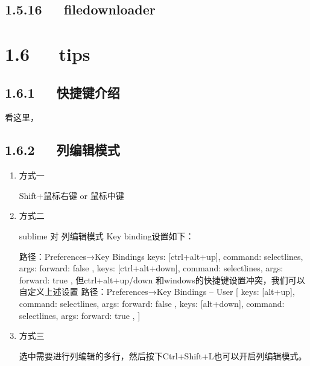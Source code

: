 \documentclass[letterpaper,12pt,english]{sphinxmanual}
\begin{document}
\subsection{1.5.16   file\sphinxhyphen{}downloader}
\label{\detokenize{001software/001install/sublime:file-downloader}}

\section{1.6   tips}
\label{\detokenize{001software/001install/sublime:tips}}

\subsection{1.6.1   快捷键介绍}
\label{\detokenize{001software/001install/sublime:id4}}
看这里，


\subsection{1.6.2   列编辑模式}
\label{\detokenize{001software/001install/sublime:id5}}\begin{enumerate}
%
\item {} 
方式一

Shift+鼠标右键 or 鼠标中键

\item {} 
方式二

sublime 对 列编辑模式 Key binding设置如下：

\begin{sphinxVerbatim}[commandchars=\\\{\}]
路径：Preferences→Key Bindings
   \PYGZob{} \PYGZdq{}keys\PYGZdq{}: [\PYGZdq{}ctrl+alt+up\PYGZdq{}], \PYGZdq{}command\PYGZdq{}: \PYGZdq{}select\PYGZus{}lines\PYGZdq{}, \PYGZdq{}args\PYGZdq{}: \PYGZob{}\PYGZdq{}forward\PYGZdq{}: false\PYGZcb{} \PYGZcb{},
   \PYGZob{} \PYGZdq{}keys\PYGZdq{}: [\PYGZdq{}ctrl+alt+down\PYGZdq{}], \PYGZdq{}command\PYGZdq{}: \PYGZdq{}select\PYGZus{}lines\PYGZdq{}, \PYGZdq{}args\PYGZdq{}: \PYGZob{}\PYGZdq{}forward\PYGZdq{}: true\PYGZcb{} \PYGZcb{},
但ctrl+alt+up/down 和windows的快捷键设置冲突，我们可以自定义上述设置
路径：Preferences→Key Bindings – User
[\PYGZob{} \PYGZdq{}keys\PYGZdq{}: [\PYGZdq{}alt+up\PYGZdq{}], \PYGZdq{}command\PYGZdq{}: \PYGZdq{}select\PYGZus{}lines\PYGZdq{}, \PYGZdq{}args\PYGZdq{}: \PYGZob{}\PYGZdq{}forward\PYGZdq{}: false\PYGZcb{} \PYGZcb{},
 \PYGZob{} \PYGZdq{}keys\PYGZdq{}: [\PYGZdq{}alt+down\PYGZdq{}], \PYGZdq{}command\PYGZdq{}: \PYGZdq{}select\PYGZus{}lines\PYGZdq{}, \PYGZdq{}args\PYGZdq{}: \PYGZob{}\PYGZdq{}forward\PYGZdq{}: true\PYGZcb{} \PYGZcb{},
]
\end{sphinxVerbatim}

\item {} 
方式三

选中需要进行列编辑的多行，然后按下Ctrl+Shift+L也可以开启列编辑模式。

\end{enumerate}
\end{document}
